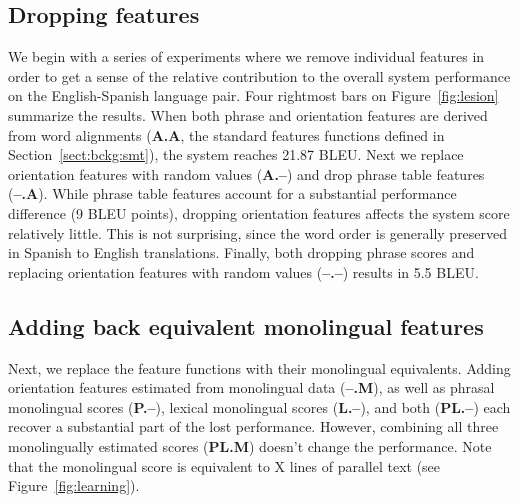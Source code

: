 \documentclass[11pt]{article}
\newcommand{\mnote}[1]{\marginpar{%
  \vskip-\baselineskip
  \raggedright\footnotesize
  \itshape\hrule\smallskip\tiny{#1}\par\smallskip\hrule}}
\newcommand{\mtodo}[1]{\mnote{\textcolor{red}{#1}}}
\newcommand{\secref}[1]{Section~\ref{#1}}
\newcommand{\figref}[1]{Figure~\ref{#1}}
\begin{document}
\subsection{Dropping features}

We begin with a series of experiments where we remove individual features in order to get a sense of the relative contribution to the overall system performance on the English-Spanish language pair. Four rightmost bars on \figref{fig:lesion} summarize the results.  When both phrase and orientation features are derived from word alignments ({\bf A.A}, the standard features functions defined in \secref{sect:bckg:smt}), the system reaches 21.87 BLEU.  Next we replace orientation features with random values ({\bf A.--}) and drop phrase table features ({\bf --.A}).  While phrase table features account for a substantial performance difference (9 BLEU points), dropping orientation features affects the system score relatively little.  This is not surprising, since the word order is generally preserved in Spanish to English translations.  Finally, both dropping phrase scores and replacing orientation features with random values ({\bf --.--}) results in 5.5 BLEU.

\subsection{Adding back equivalent monolingual features}

Next, we replace the feature functions with their monolingual equivalents.  Adding orientation features estimated from monolingual data ({\bf --.M}), as well as phrasal monolingual scores ({\bf P.--}), lexical monolingual scores ({\bf L.--}), and both ({\bf PL.--}) each recover a substantial part of the lost performance.  However, combining all three monolingually estimated scores ({\bf PL.M}) doesn't change the performance. \mtodo{Fix here and in legend when new results are in.}  Note that the monolingual score is equivalent to X lines of parallel text (see \figref{fig:learning}).  \mtodo{Fill in from learning curve.}
\end{document}
